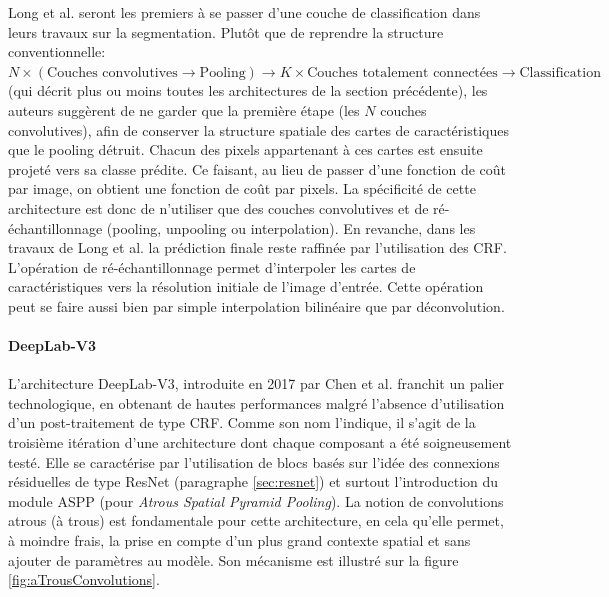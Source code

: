 Long et al. \cite{longFullyConvolutionalNetworks2015a} seront les premiers à se passer d'une couche de classification dans leurs travaux sur la segmentation. Plutôt que de reprendre la structure conventionnelle: $N \times (\text{Couches convolutives} \rightarrow \text{Pooling}) \rightarrow K \times \text{Couches totalement connectées} \rightarrow \text{Classification}$ (qui décrit plus ou moins toutes les architectures de la section précédente), les auteurs suggèrent de ne garder que la première étape (les $N$ couches convolutives), afin de conserver la structure spatiale des cartes de caractéristiques que le pooling détruit. Chacun des pixels appartenant à ces cartes est ensuite projeté vers sa classe prédite. Ce faisant, au lieu de passer d'une fonction de coût par image, on obtient une fonction de coût par pixels. La spécificité de cette architecture est donc de n'utiliser que des couches convolutives et de ré-échantillonnage (pooling, unpooling ou interpolation). En revanche, dans les travaux de Long et al. la prédiction finale reste raffinée par l'utilisation des \ac{CRF}. L'opération de ré-échantillonnage permet d'interpoler les cartes de caractéristiques vers la résolution initiale de l'image d'entrée. Cette opération peut se faire aussi bien par simple interpolation bilinéaire que par déconvolution.
\paragraph{DeepLab-V3}
L'architecture DeepLab-V3, introduite en 2017 par Chen et al. \cite{chenRethinkingAtrousConvolution2017} franchit un palier technologique, en obtenant de hautes performances malgré l'absence d'utilisation d'un post-traitement de type \ac{CRF}. Comme son nom l'indique, il s'agit de la troisième itération d'une architecture dont chaque composant a été soigneusement testé. Elle se caractérise par l'utilisation de blocs basés sur l'idée des connexions résiduelles de type ResNet (paragraphe \ref{sec:resnet}) et surtout l'introduction du module ASPP (pour \textit{Atrous Spatial Pyramid Pooling}). La notion de convolutions atrous (à trous) est fondamentale pour cette architecture, en cela qu'elle permet, à moindre frais, la prise en compte d'un plus grand contexte spatial et sans ajouter de paramètres au modèle. Son mécanisme est illustré sur la figure \ref{fig:aTrousConvolutions}.

